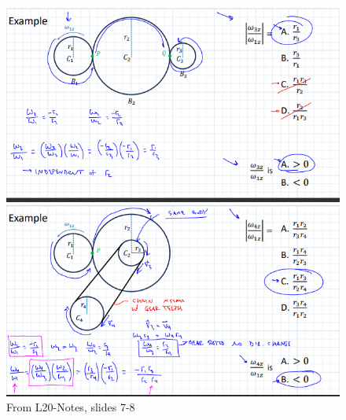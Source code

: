     \begin{figure}[h!]
         \centering  \includegraphics{RigidBodyKinematics/GearsExamples.png}    
         \caption{From L20-Notes, slides 7-8}
         \label{fig:GearsExamples}
    \end{figure}

    \subsubsection{}

